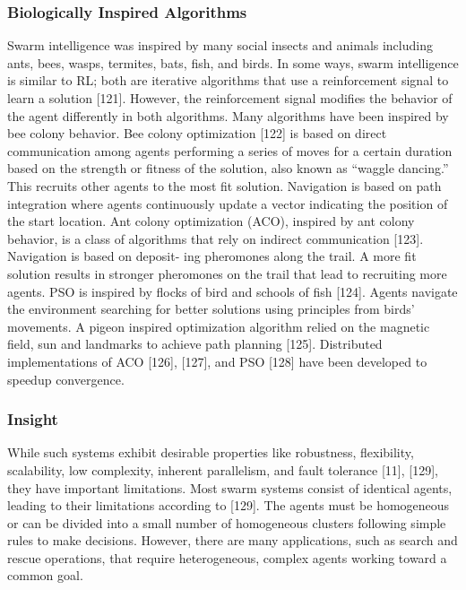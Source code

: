 \documentclass{article}
\begin{document}
			\subsubsection{Biologically Inspired Algorithms}
			Swarm intelligence was inspired by many social insects and animals  including ants, bees, wasps, termites, bats, fish, and birds. In some ways, swarm intelligence is similar to RL; both are iterative algorithms that use a reinforcement signal to learn a solution \cite{rizk-2018-decision-making-in-multiagent-systems-a-survey}[121]. However, the reinforcement signal modifies the behavior of the agent differently in both algorithms. Many algorithms have been inspired by bee colony behavior. Bee colony optimization \cite{rizk-2018-decision-making-in-multiagent-systems-a-survey}[122] is based on direct communication among agents performing a series of moves for a certain duration based on the strength or fitness of the solution, also known as “waggle dancing.” This recruits other agents to the most fit solution. Navigation is based on path integration where agents continuously update a vector indicating the position of the start location. Ant colony optimization (ACO), inspired by ant colony behavior, is a class of algorithms that rely on indirect communication \cite{rizk-2018-decision-making-in-multiagent-systems-a-survey}[123]. Navigation is based on deposit-
			ing pheromones along the trail. A more fit solution results in stronger pheromones on the trail that lead to recruiting
			more agents. PSO is inspired by flocks of bird and schools of fish \cite{rizk-2018-decision-making-in-multiagent-systems-a-survey}[124]. Agents navigate the environment searching for better solutions using principles from birds’ movements. A pigeon inspired optimization algorithm relied on the magnetic field, sun and landmarks to achieve path planning \cite{rizk-2018-decision-making-in-multiagent-systems-a-survey}[125]. Distributed
			implementations of ACO \cite{rizk-2018-decision-making-in-multiagent-systems-a-survey}[126], [127], and PSO \cite{rizk-2018-decision-making-in-multiagent-systems-a-survey}[128] have been developed to speedup convergence.
			
			\subsubsection{Insight}
			While such systems exhibit desirable properties like robustness, flexibility, scalability, low complexity, inherent parallelism, and fault tolerance \cite{rizk-2018-decision-making-in-multiagent-systems-a-survey}[11], [129], they have important limitations. Most swarm systems consist of identical agents,
			leading to their limitations according to \cite{rizk-2018-decision-making-in-multiagent-systems-a-survey}[129]. The agents must be homogeneous or can be divided into a small number of homogeneous clusters following simple rules to make decisions. However, there are many applications, such as search and rescue operations, that require heterogeneous, complex agents working toward a common goal.
			
\end{document}
